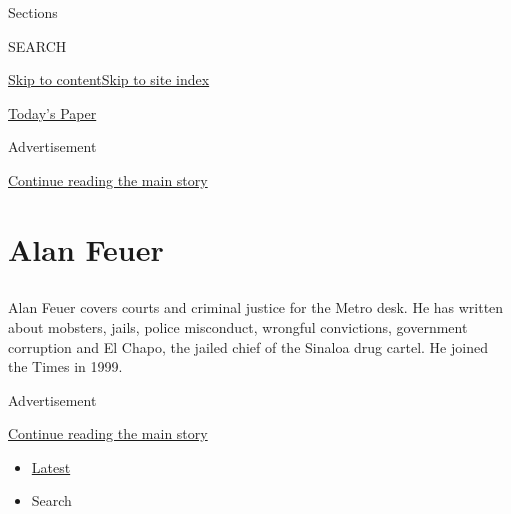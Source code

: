 Sections

SEARCH

\protect\hyperlink{site-content}{Skip to
content}\protect\hyperlink{site-index}{Skip to site index}

\href{https://myaccount.nytimes.com/auth/login?response_type=cookie\&client_id=vi}{}

\href{https://www.nytimes.com/section/todayspaper}{Today's Paper}

Advertisement

\protect\hyperlink{after-top}{Continue reading the main story}

\hypertarget{alan-feuer}{%
\section{Alan Feuer}\label{alan-feuer}}

\subsection{}

Alan Feuer covers courts and criminal justice for the Metro desk. He has
written about mobsters, jails, police misconduct, wrongful convictions,
government corruption and El Chapo, the jailed chief of the Sinaloa drug
cartel. He joined the Times in 1999.

Advertisement

\protect\hyperlink{after-mid1}{Continue reading the main story}

\begin{itemize}
\tightlist
\item
  \protect\hyperlink{stream-panel}{Latest}
\item
  Search
\end{itemize}

